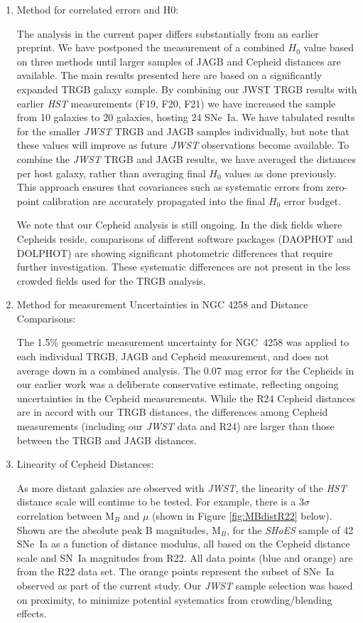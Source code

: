\documentclass[12pt,modern]{aastex631}
\newcommand{\ho}{$H_{0}$\xspace}
\newcommand{\hst}{\emph{HST}\xspace}
\newcommand{\jwst}{\emph{JWST}\xspace}
\newcommand{\sne}{SNe~Ia\xspace}
\newcommand{\sn}{SN~Ia\xspace}
\newcommand{\shoes}{\emph{SHoES}\xspace}
\newcommand{\ngc}{NGC\,\xspace}
\begin{document}
\begin{enumerate}

\item{Method for correlated errors and H0:}

The analysis in the current paper differs substantially from an earlier preprint. We have postponed the measurement of a combined \ho value based on three methods until larger samples of JAGB and Cepheid distances are available.  The main results presented here are based on a significantly expanded TRGB galaxy sample. By combining our JWST TRGB results with earlier \hst measurements (F19, F20, F21) we have increased the sample from 10 galaxies to 20 galaxies, hosting 24 \sne. We have tabulated results for the smaller \jwst TRGB and JAGB samples individually, but note that  these values will improve as future \jwst observations become available.  To combine the \jwst TRGB and JAGB results, we have averaged the distances per host galaxy, rather than averaging final \ho values as  done previously. This approach ensures that covariances such as systematic errors from zero-point calibration are accurately propagated into the final \ho error budget.  

We note that our Cepheid analysis is still ongoing. In the disk fields where Cepheids reside, comparisons of different software packages (DAOPHOT and DOLPHOT) are showing significant photometric differences that require further investigation. These systematic differences are not present in the less crowded fields used for the TRGB analysis.

\item{ Method for measurement Uncertainties in NGC 4258 and Distance Comparisons:}

The  1.5\% geometric measurement uncertainty for \ngc 4258 was applied to each individual TRGB, JAGB and Cepheid measurement, and does not average down in a combined analysis. The 0.07  mag error for the Cepheids in our earlier work was a deliberate conservative estimate, reflecting ongoing uncertainties in the Cepheid measurements. While the R24 Cepheid distances are in accord with our TRGB distances,  the differences among Cepheid measurements (including our \jwst data and R24) are larger than those between the TRGB and JAGB distances. 

\item{Linearity of Cepheid Distances:}

As more distant galaxies are observed with \jwst, the linearity of the \hst distance scale will continue to be tested.  For example, there is a 3$\sigma$ correlation between M$_B$ and $\mu$  (shown in Figure \ref{fig:MBdistR22} below). Shown are the absolute peak B magnitudes, M$_B$, for the \shoes sample of 42 \sne as a function of distance modulus, all based on the Cepheid distance scale and \sn magnitudes from R22. All data points (blue and orange) are from the R22 data set. The orange points represent the subset of \sne observed as part of the current study. Our \jwst sample selection was based on proximity, to minimize potential systematics from crowding/blending effects.  


\end{enumerate}
\end{document}
